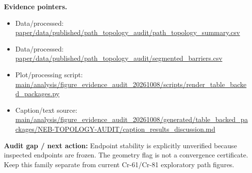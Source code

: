 \documentclass[10pt]{article}
\newcommand{\statusline}[1]{\colorbox{gray!12}{\parbox{0.96\linewidth}{#1}}}
\begin{document}
\textbf{Evidence pointers.}
\begin{itemize}[leftmargin=1.4em,noitemsep]
\item Data/processed: \begingroup\scriptsize\url{paper/data/published/path_topology_audit/path_topology_summary.csv}\endgroup
\item Data/processed: \begingroup\scriptsize\url{paper/data/published/path_topology_audit/segmented_barriers.csv}\endgroup
\item Plot/processing script: \begingroup\scriptsize\url{main/analysis/figure_evidence_audit_20261008/scripts/render_table_backed_packages.py}\endgroup
\item Caption/text source: \begingroup\scriptsize\url{main/analysis/figure_evidence_audit_20261008/generated/table_backed_packages/NEB-TOPOLOGY-AUDIT/caption_results_discussion.md}\endgroup
\end{itemize}
\statusline{\textbf{Audit gap / next action:} Endpoint stability is explicitly unverified because inspected endpoints are frozen. The geometry flag is not a convergence certificate. Keep this family separate from current Cr-61/Cr-81 exploratory path figures.}
\vfill
\end{document}
